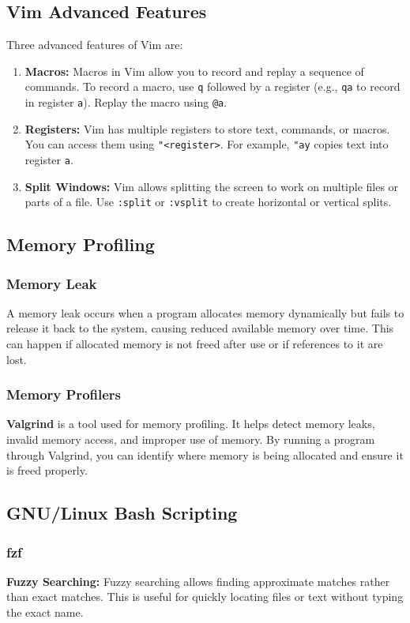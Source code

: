 \documentclass[12pt,a4paper]{article}
\begin{document}
\subsection{Vim Advanced Features}
Three advanced features of Vim are:
\begin{enumerate}
    \item \textbf{Macros:} Macros in Vim allow you to record and replay a sequence of commands. To record a macro, use \texttt{q} followed by a register (e.g., \texttt{qa} to record in register \texttt{a}). Replay the macro using \texttt{@a}.
    \item \textbf{Registers:} Vim has multiple registers to store text, commands, or macros. You can access them using \texttt{"<register>}. For example, \texttt{"ay} copies text into register \texttt{a}.
    \item \textbf{Split Windows:} Vim allows splitting the screen to work on multiple files or parts of a file. Use \texttt{:split} or \texttt{:vsplit} to create horizontal or vertical splits.
\end{enumerate}

\subsection{Memory Profiling}
\subsubsection{Memory Leak}
A memory leak occurs when a program allocates memory dynamically but fails to release it back to the system, causing reduced available memory over time. This can happen if allocated memory is not freed after use or if references to it are lost.

\subsubsection{Memory Profilers}
\textbf{Valgrind} is a tool used for memory profiling. It helps detect memory leaks, invalid memory access, and improper use of memory. By running a program through Valgrind, you can identify where memory is being allocated and ensure it is freed properly.

\subsection{GNU/Linux Bash Scripting}
\subsubsection{fzf}
\textbf{Fuzzy Searching:} Fuzzy searching allows finding approximate matches rather than exact matches. This is useful for quickly locating files or text without typing the exact name.
\end{document}
